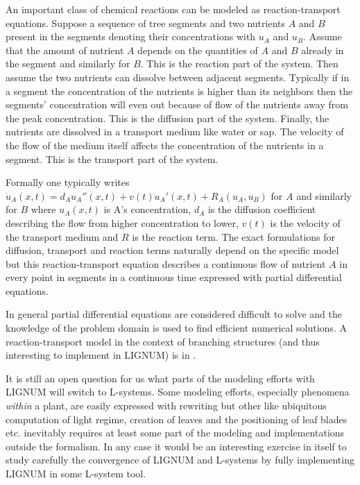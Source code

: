 An  important   class  of  chemical   reactions  can  be   modeled  as
reaction-transport equations. Suppose a  sequence of tree segments and
two  nutrients $A$  and $B$  present  in the  segments denoting  their
concentrations  with  $u_A$ and  $u_B$.   Assume  that  the amount  of
nutrient $A$ depends  on the quantities of $A$ and  $B$ already in the
segment  and similarly  for $B$.   This is  the reaction  part  of the
system. Then  assume the two  nutrients can dissolve  between adjacent
segments.   Typically  if  in  a  segment  the  concentration  of  the
nutrients   is  higher   than   its  neighbors   then  the   segments'
concentration will even out because of flow of the nutrients away from
the peak  concentration.  This  is the diffusion  part of  the system.
Finally, the nutrients are dissolved  in a transport medium like water
or sap.  The velocity  of the  flow of the  medium itself  affects the
concentration of  the nutrients  in a segment.  This is  the transport
part of the system.

Formally  one  typically  writes  $\dot{u}_A(x,t)  =  d_Au_A''(x,t)  +
v(t)u_A'(x,t)  + R_A(u_A,u_B)$  for $A$  and similarly  for  $B$ where
$u_A(x,t)$ is  A's concentration,  $d_A$ is the  diffusion coefficient
describing the flow from higher  concentration to lower, $v(t)$ is the
velocity of  the transport medium and  $R$ is the  reaction term.  The
exact  formulations  for   diffusion,  transport  and  reaction  terms
naturally  depend on  the specific  model but  this reaction-transport
equation describes a continuous flow of nutrient $A$ in every point in
segments  in a  continuous  time expressed  with partial  differential
equations.

In general partial differential  equations are considered difficult to
solve  and  the  knowledge of  the  problem  domain  is used  to  find
efficient  numerical  solutions.  A  reaction-transport  model in  the
context of branching structures  (and thus interesting to implement in
LIGNUM) is in \citet{palovaara:03}.

It is still an open question for us what parts of the modeling efforts
with  LIGNUM  will  switch   to  L-systems.   Some  modeling  efforts,
especially phenomena  {\it within} a plant, are  easily expressed with
rewriting  but  other like  ubiquitous  computation  of light  regime,
creation of leaves and the positioning of leaf blades etc.  inevitably
requires  at  least some  part  of  the  modeling and  implementations
outside  the  formalism.  In  any  case  it  would be  an  interesting
exercise in  itself to study  carefully the convergence of  LIGNUM and
L-systems by fully implementing LIGNUM in some L-system tool.


